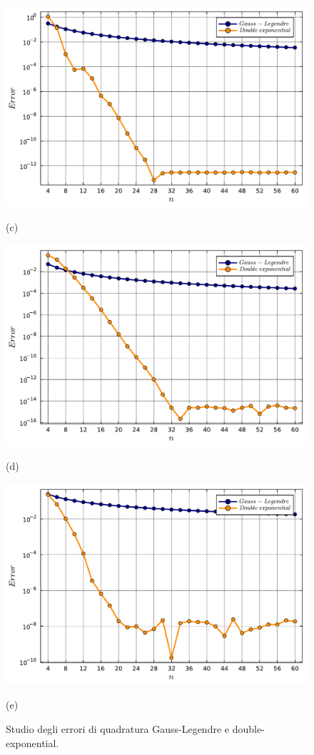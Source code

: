 \documentclass[letterpaper, 12pt]{article}
\numberwithin{equation}{section}    %
\begin{document}
\begin{figure}[!ht]
    \begin{minipage}[b]{0.47\textwidth}
        \includegraphics[width=\textwidth]{5433.pdf}
        \caption*{(c)}
    \end{minipage}
    \begin{minipage}[b]{0.47\textwidth}
        \includegraphics[width=\textwidth]{5434.pdf}
        \caption*{(d)}
    \end{minipage}
    \begin{minipage}[b]{0.47\textwidth}
        \includegraphics[width=\textwidth]{5435.pdf}
        \caption*{(e)}
    \end{minipage}
    \caption{Studio degli errori di quadratura Gauss-Legendre e double-exponential.}
    \label{fig:es5_4_3_1}
\end{figure}
\end{document}
